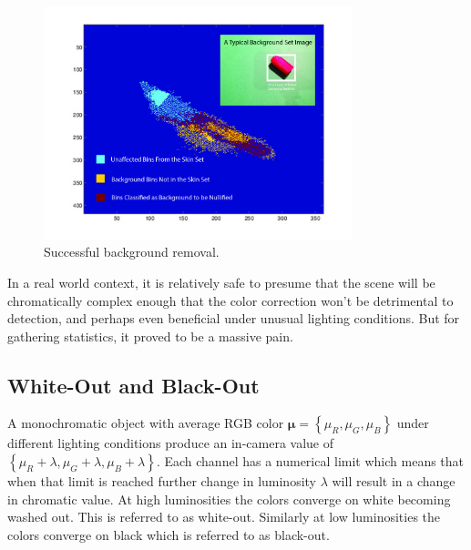 \begin{figure}[h!]
  \centering
    \includegraphics[width=0.80\textwidth]{Chapter3/Figs/CaCb_bg_success.jpg}
    \caption{Successful background removal.}  \label{fig:BGSuccess1}
\end{figure}

In a real world context, it is relatively safe to presume that the scene will be chromatically complex enough that the color correction won't be detrimental to detection, and perhaps even beneficial under unusual lighting conditions. But for gathering statistics, it proved to be a massive pain.

\subsection{White-Out and Black-Out}\label{sec:WhiteoutAndBlackout}
A monochromatic object with average RGB color $\mathbf{\mu}=\left\{\mu_R, \mu_G, \mu_B \right\}$ under different lighting conditions produce an in-camera value of $\left\{\mu_R +\lambda, \mu_G  +\lambda, \mu_B +\lambda \right\}$. Each channel has a numerical limit which means that when that limit is reached further change in luminosity $\lambda$ will result in a change in chromatic value. At high luminosities the colors converge on white becoming washed out. This is referred to as white-out. Similarly at low luminosities the colors converge on black which is referred to as black-out.

